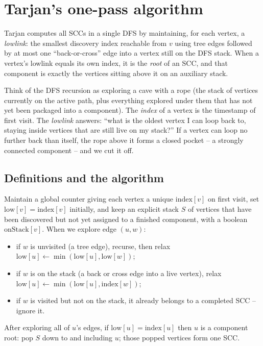 \section{Tarjan's one-pass algorithm}
\label{ch05:tarjan}

Tarjan computes all SCCs in a single DFS by maintaining, for each vertex, a \emph{lowlink}: the smallest discovery index reachable from $v$ using tree edges followed by at most one ``back-or-cross'' edge into a vertex still on the DFS stack. When a vertex's lowlink equals its own index, it is the \emph{root} of an SCC, and that component is exactly the vertices sitting above it on an auxiliary stack.

\begin{intuitionbox}
Think of the DFS recursion as exploring a cave with a rope (the stack of vertices currently on the active path, plus everything explored under them that has not yet been packaged into a component). The \emph{index} of a vertex is the timestamp of first visit. The \emph{lowlink} answers: ``what is the oldest vertex I can loop back to, staying inside vertices that are still live on my stack?'' If a vertex can loop no further back than itself, the rope above it forms a closed pocket -- a strongly connected component -- and we cut it off.
\end{intuitionbox}

\subsection{Definitions and the algorithm}

Maintain a global counter giving each vertex a unique $\mathrm{index}[v]$ on first visit, set $\mathrm{low}[v]=\mathrm{index}[v]$ initially, and keep an explicit stack $S$ of vertices that have been discovered but not yet assigned to a finished component, with a boolean $\mathrm{onStack}[v]$. When we explore edge $(u,w)$:
\begin{itemize}
\item if $w$ is unvisited (a tree edge), recurse, then relax $\mathrm{low}[u]\gets\min(\mathrm{low}[u],\mathrm{low}[w])$;
\item if $w$ is on the stack (a back or cross edge into a live vertex), relax $\mathrm{low}[u]\gets\min(\mathrm{low}[u],\mathrm{index}[w])$;
\item if $w$ is visited but not on the stack, it already belongs to a completed SCC -- ignore it.
\end{itemize}
After exploring all of $u$'s edges, if $\mathrm{low}[u]=\mathrm{index}[u]$ then $u$ is a component root: pop $S$ down to and including $u$; those popped vertices form one SCC.

